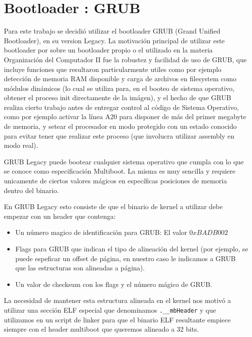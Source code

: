 \section{Bootloader : GRUB}
\label{sec::grub}

Para este trabajo se decidi\'o utilizar el bootloader GRUB (Grand Unified Bootloader),
en su version Legacy. La motivaci\'on principal de utilizar este bootloader por sobre
un bootloader propio o el utilizado en la materia Organizaci\'on del Computador II fue
la robustez y facilidad de uso de GRUB, que incluye funciones que resultaron particularmente
utiles como por ejemplo detecci\'on de memoria RAM disponible y carga de archivos en filesystem
como m\'odulos din\'amicos (lo cual se utiliza para, en el booteo de sistema operativo, obtener 
el proceso init directamente de la im\'agen), y el hecho de que GRUB realiza cierto trabajo antes
de entregar control al c\'odigo de Sistema Operativo, como por ejemplo activar la l\'inea A20 para
disponer de m\'as del primer megabyte de memoria, y setear el procesador en modo protegido con un
estado conocido para evitar tener que realizar este proceso (que involucra utilizar assembly en modo real). 

GRUB Legacy puede bootear cualquier sistema operativo que cumpla con lo que se conoce como especificaci\'on
Multiboot. La misma es muy sencilla y requiere unicamente de ciertos valores m\'agicos en espec\'ificas posiciones
de memoria dentro del binario. 

En GRUB Legacy esto consiste de que el binario de kernel a utilizar debe empezar con un header que contenga:

\begin{itemize}
	\item Un n\'umero magico de identificaci\'on para GRUB: El valor $0xBADB002$
	\item Flags para GRUB que indican el tipo de alineaci\'on del kernel (por ejemplo, se puede espeficar un offset
	de p\'agina, en nuestro caso le indicamos a GRUB que las estructuras son alineadas a p\'agina).
	\item Un valor de checksum con los flags y el n\'umero m\'agico de GRUB.  
\end{itemize}

La necesidad de mantener esta estructura alineada en el kernel nos motiv\'o a utilizar una secci\'on ELF especial
que denominamos \texttt{.\_\_mbHeader} y que utilizamos en un script de linker para que el binario ELF resultante empiece siempre
con el header multiboot que queremos alineado a 32 bits.

